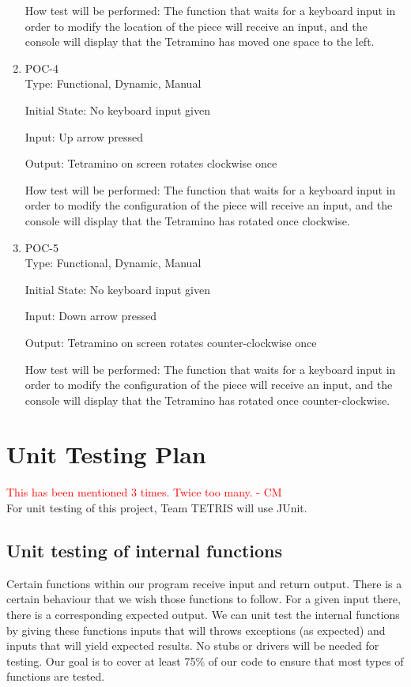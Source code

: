 \documentclass[12pt, titlepage]{article}
\begin{document}
\begin{enumerate}
How test will be performed: The function that waits for a keyboard input in order to modify the location of the piece will receive an input, and the console will display that the Tetramino has moved one space to the left.

\item{POC-4\\}
Type: Functional, Dynamic, Manual
					
Initial State: No keyboard input given
					
Input: Up arrow pressed
					
Output: Tetramino on screen rotates clockwise once
					
How test will be performed: The function that waits for a keyboard input in order to modify the configuration of the piece will receive an input, and the console will display that the Tetramino has rotated once clockwise.

\item{POC-5\\}
Type: Functional, Dynamic, Manual
					
Initial State: No keyboard input given
					
Input: Down arrow pressed
					
Output: Tetramino on screen rotates counter-clockwise once
					
How test will be performed: The function that waits for a keyboard input in order to modify the configuration of the piece will receive an input, and the console will display that the Tetramino has rotated once counter-clockwise.
					
\end{enumerate}

\section{Unit Testing Plan}
\textcolor{red}{This has been mentioned 3 times. Twice too many. - CM} \\
For unit testing of this project, Team TETRIS will use JUnit.

\subsection{Unit testing of internal functions}
Certain functions within our program receive input and return output. There is a certain behaviour that we wish those functions to follow. For a given input there, there is a corresponding expected output. We can unit test the internal functions by giving these functions inputs that will throws exceptions (as expected) and inputs that will yield expected results. No stubs or drivers will be needed for testing. Our goal is to cover at least 75\%  of our code to ensure that most types of functions are tested.        		
\end{document}
